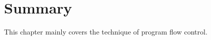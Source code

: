 \documentclass[../main.tex]{subfiles}
\begin{document}
    \section{Summary}
    This chapter mainly covers the technique of program flow control.
\end{document}
